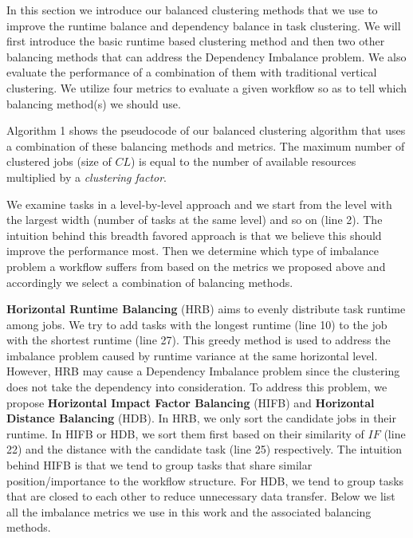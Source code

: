 In this section we introduce our balanced clustering methods that we use to improve the runtime balance and dependency balance in task clustering. We will first introduce the basic runtime based clustering method and then two other balancing methods that can address the Dependency Imbalance problem. We also evaluate the performance of a combination of them with traditional vertical clustering. We utilize four metrics to evaluate a given workflow so as to tell which balancing method(s) we should use. 



Algorithm 1 shows the pseudocode of our balanced clustering algorithm that uses a combination of these balancing methods and metrics.  The maximum number of clustered jobs (size of $CL$) is equal to the number of available resources multiplied by a {\em clustering factor}. 

We examine tasks in a level-by-level approach and we start from the level with the largest width (number of tasks at the same level) and so on (line 2). The intuition behind this breadth favored approach is that we believe this should improve the performance most. Then we determine which type of imbalance problem a workflow suffers from based on the metrics we proposed above and accordingly we select a combination of balancing methods.

\textbf{Horizontal Runtime Balancing} (HRB) aims to evenly distribute task runtime among jobs. We try to add tasks with the longest runtime (line 10) to the job with the shortest runtime (line 27). This greedy method is used to address the imbalance problem caused by runtime variance at the same horizontal level. 
However, HRB may cause a Dependency Imbalance problem since the clustering does not take the dependency into consideration. To address this problem, we propose \textbf{Horizontal Impact Factor Balancing} (HIFB) and \textbf{Horizontal Distance Balancing} (HDB). In HRB, we only sort the candidate jobs in their runtime. In HIFB or HDB, we sort them first based on their similarity of $IF$ (line 22) and the distance with the candidate task (line 25) respectively. The intuition behind HIFB is that we tend to group tasks that share similar position/importance to the workflow structure. For HDB, we tend to group tasks that are closed to each other to reduce unnecessary data transfer. Below we list all the imbalance metrics we use in this work and the associated balancing methods. 

